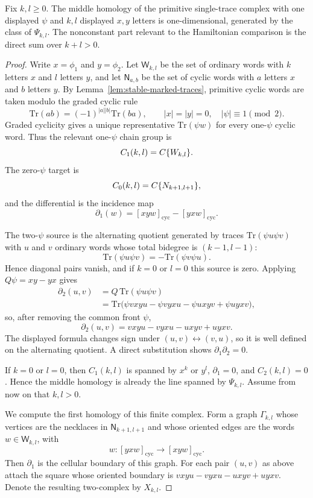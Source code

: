 \documentclass[11pt]{memoir}
\begin{document}
\begin{prop}\label{prop:one-psi-homology}
  Fix $k,l\geq0$. The middle homology of the primitive single-trace complex
  with one displayed $\psi$ and $k,l$ displayed $x,y$ letters is
  one-dimensional, generated by the class of $\Psi_{k,l}$. The nonconstant part
  relevant to the Hamiltonian comparison is the direct sum over $k+l>0$.
\end{prop}

\begin{proof}
  Write $x=\phi_1$ and $y=\phi_2$. Let $\mathsf W_{k,l}$ be the set of ordinary
  words with $k$ letters $x$ and $l$ letters $y$, and let
  $\mathsf N_{a,b}$ be the set of cyclic words with $a$ letters $x$ and $b$
	  letters $y$. By Lemma~\ref{lem:stable-marked-traces}, primitive cyclic words
	  are taken modulo the graded cyclic rule
	  $$\mathrm{Tr}(ab)=(-1)^{|a||b|}\mathrm{Tr}(ba),\qquad
	  |x|=|y|=0,\quad |\psi|\equiv1\pmod 2.$$
  Graded cyclicity gives a unique representative $\mathrm{Tr}(\psi w)$ for
  every one-$\psi$ cyclic word. Thus the relevant one-$\psi$ chain group is
  $$C_1(k,l)=C\{W_{k,l}\}.$$
  The zero-$\psi$ target is
  $$C_0(k,l)=C\{N_{k+1,l+1}\},$$
  and the differential is the incidence map
  $$\partial_1(w)=[xyw]_{\mathrm{cyc}}-[yxw]_{\mathrm{cyc}}.$$

  The two-$\psi$ source is the alternating quotient generated by traces
  $\mathrm{Tr}(\psi u\psi v)$ with $u$ and $v$ ordinary words whose total
  bidegree is $(k-1,l-1)$:
  $$\mathrm{Tr}(\psi u\psi v)=-\mathrm{Tr}(\psi v\psi u).$$
  Hence diagonal pairs vanish, and if $k=0$ or $l=0$ this source is zero.
  Applying $Q\psi=xy-yx$ gives
  \begin{align*}
  \partial_2(u,v)
    &=Q\,\mathrm{Tr}(\psi u\psi v)\\
    &=\mathrm{Tr}\bigl(\psi vxyu-\psi vyxu-\psi uxyv+\psi uyxv\bigr),
  \end{align*}
  so, after removing the common front $\psi$,
  $$\partial_2(u,v)=vxyu-vyxu-uxyv+uyxv.$$
  The displayed formula changes sign under $(u,v)\leftrightarrow(v,u)$, so it
  is well defined on the alternating quotient.
  A direct substitution shows $\partial_1\partial_2=0$.

  If $k=0$ or $l=0$, then $C_1(k,l)$ is spanned by $x^k$ or $y^l$,
  $\partial_1=0$, and $C_2(k,l)=0$. Hence the middle homology is already the
  line spanned by $\Psi_{k,l}$. Assume from now on that $k,l>0$.

  We compute the first homology of this finite complex. Form a graph
  $\Gamma_{k,l}$ whose vertices are the necklaces in $\mathsf N_{k+1,l+1}$ and
  whose oriented edges are the words $w\in\mathsf W_{k,l}$, with
  $$w:[yxw]_{\mathrm{cyc}}\longrightarrow[xyw]_{\mathrm{cyc}}.$$
  Then $\partial_1$ is the cellular boundary of this graph. For each pair
  $(u,v)$ as above attach the square whose oriented boundary is
  $vxyu-vyxu-uxyv+uyxv$. Denote the resulting two-complex by $X_{k,l}$.


\end{proof}
\end{document}
